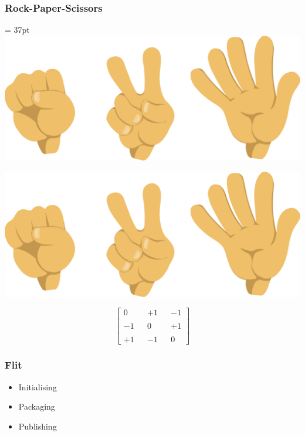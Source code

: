 \begin{frame}
    \frametitle{Rock-Paper-Scissors}

    \hfuzz = 37pt
    \hspace{3.9cm}
    \vspace{-1cm}
    \includegraphics[width=.27\textwidth]{Bin/rock-paper-scissors.png}
    \begin{multicols}{3}
        \begin{flushright}
            \includegraphics[height=0.12\textheight, angle=270]{Bin/rock-paper-scissors.png}
        \end{flushright}
            
        \columnbreak
 
        \begin{equation*}
            \begin{bmatrix}
                0 & & +1 & & -1 \\
                & & & & \\
                -1 & & 0 & & +1 \\
                & & & & \\
                +1 & & -1 & & 0
            \end{bmatrix}
        \end{equation*}

        \columnbreak
        \vfill
    \end{multicols}

\end{frame}



\begin{frame}
    \frametitle{Flit}
    \centering
    \Large 

    \begin{itemize}
        \item Initialising
        \item Packaging
        \item Publishing
    \end{itemize}

\end{frame}



